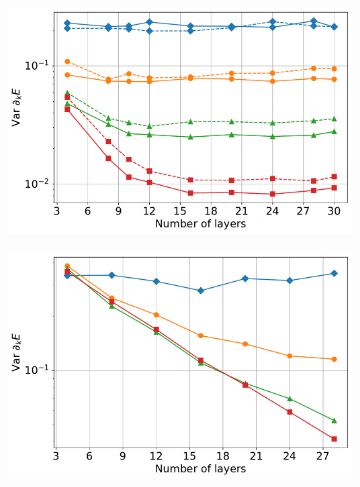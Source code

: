 
\begin{figure}
    \centering
    \begin{subfigure}{.48\linewidth}
        \centering
        \includegraphics[width=\textwidth]{figures/plateau_hubbard_jw_both.pdf}
    \end{subfigure}\begin{subfigure}{.48\linewidth}
        \centering
        \includegraphics[width=\textwidth]{figures/plateau_hubbard_bk.pdf}
    \end{subfigure}
    \begin{subfigure}{.48\linewidth}
        \centering

\end{subfigure}
\end{figure}
